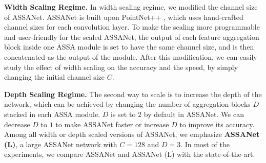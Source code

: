 \documentclass{article}
\newcommand{\mysection}[1]{\vspace{3pt}\noindent\textbf{#1.}}
\begin{document}
\mysection{Width Scaling Regime} 
In width scaling regime, we modified the channel size of ASSANet. ASSANet is built upon PointNet++ \cite{Qi2017PointNetDH}, which uses hand-crafted channel sizes for each convolution layer. To make the scaling more programmable and user-friendly for the scaled ASSANet, the output of each feature aggregation block inside one ASSA module is set to have the same channel size, and is then concatenated as the output of the module. After this modification, we can easily study the effect of width scaling on the accuracy and the speed, by simply changing the initial channel size $C$.

\mysection{Depth Scaling Regime} 
The second way to scale is to increase the depth of the network, which can be achieved by changing the number of aggregation blocks $D$ stacked in each ASSA module. $D$ is set to $2$ by default in ASSANet. We can decrease $D$ to $1$ to make ASSANet faster or increase $D$ to improve its accuracy. Among all width or depth scaled versions of ASSANet, we emphasize \textbf{ASSANet (L)}, a large ASSANet network with $C=128$ and $D=3$. In most of the experiments, we compare ASSANet and ASSANet (L) with the state-of-the-art. 
\end{document}
